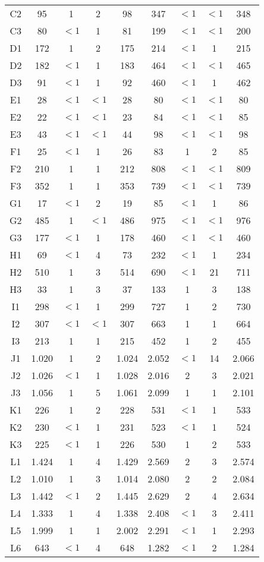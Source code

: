 \begin{center}
\begin{longtable}{ccccc|cccc}
C2&95&1&2&98&347&$<1$&$<1$&348\\
C3&80&$<1$&1&81&199&$<1$&$<1$&200\\
D1&172&1&2&175&214&$<1$&1&215\\
D2&182&$<1$&1&183&464&$<1$&$<1$&465\\
D3&91&$<1$&1&92&460&$<1$&1&462\\
E1&28&$<1$&$<1$&28&80&$<1$&$<1$&80\\
E2&22&$<1$&$<1$&23&84&$<1$&$<1$&85\\
E3&43&$<1$&$<1$&44&98&$<1$&$<1$&98\\
F1&25&$<1$&1&26&83&1&2&85\\
F2&210&1&1&212&808&$<1$&$<1$&809\\
F3&352&1&1&353&739&$<1$&$<1$&739\\
G1&17&$<1$&2&19&85&$<1$&1&86\\
G2&485&1&$<1$&486&975&$<1$&$<1$&976\\
G3&177&$<1$&1&178&460&$<1$&$<1$&460\\
H1&69&$<1$&4&73&232&$<1$&1&234\\
H2&510&1&3&514&690&$<1$&21&711\\
H3&33&1&3&37&133&1&3&138\\
I1&298&$<1$&1&299&727&1&2&730\\
I2&307&$<1$&$<1$&307&663&1&1&664\\
I3&213&1&1&215&452&1&2&455\\
J1&1.020&1&2&1.024&2.052&$<1$&14&2.066\\
J2&1.026&$<1$&1&1.028&2.016&2&3&2.021\\
J3&1.056&1&5&1.061&2.099&1&1&2.101\\
K1&226&1&2&228&531&$<1$&1&533\\
K2&230&$<1$&1&231&523&$<1$&1&524\\
K3&225&$<1$&1&226&530&1&2&533\\
L1&1.424&1&4&1.429&2.569&2&3&2.574\\
L2&1.010&1&3&1.014&2.080&2&2&2.084\\
L3&1.442&$<1$&2&1.445&2.629&2&4&2.634\\
L4&1.333&1&4&1.338&2.408&$<1$&3&2.411\\
L5&1.999&1&1&2.002&2.291&$<1$&1&2.293\\
L6&643&$<1$&4&648&1.282&$<1$&2&1.284\\
\end{longtable}
\end{center}

